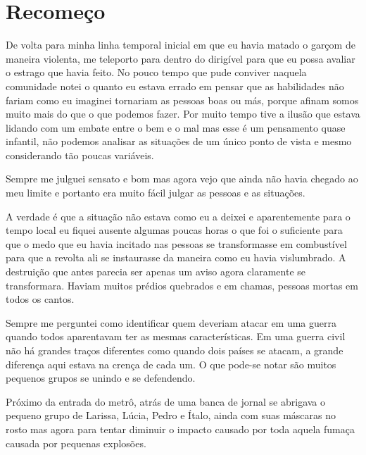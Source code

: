 
\chapter{Recomeço}


De volta para minha linha temporal  inicial em que eu havia matado o garçom de maneira violenta, me teleporto para dentro do dirigível para que eu possa avaliar o estrago que havia feito. No pouco tempo que pude conviver naquela comunidade notei o quanto eu estava errado em pensar que as habilidades não fariam como eu imaginei tornariam as pessoas boas ou más, porque afinam somos muito mais do que o que podemos fazer. Por muito tempo tive a ilusão que estava lidando com um embate entre o bem e o mal mas esse é um pensamento quase infantil, não podemos analisar as situações de um único ponto de vista e mesmo considerando tão poucas variáveis.

Sempre me julguei sensato e bom mas agora vejo que ainda não havia chegado ao meu limite e portanto era muito fácil julgar as pessoas e as situações. 

A verdade é que a situação não estava como eu a deixei e aparentemente para o tempo local eu fiquei ausente algumas poucas horas o que foi o suficiente para que o medo que eu havia incitado nas pessoas se transformasse em combustível para que a revolta ali se instaurasse da maneira como eu havia vislumbrado. A destruição que antes parecia ser apenas um aviso agora claramente se transformara.  Haviam muitos prédios quebrados e em chamas, pessoas mortas em todos os cantos.

Sempre me perguntei como identificar quem deveriam atacar em uma guerra quando todos aparentavam ter as mesmas características. Em uma guerra civil não há grandes traços diferentes como quando dois países se atacam, a grande diferença aqui estava na crença de cada um. O que pode-se notar são muitos pequenos grupos se unindo e se defendendo.

Próximo da entrada do metrô, atrás de uma banca de jornal se abrigava o pequeno grupo de Larissa, Lúcia, Pedro e Ítalo, ainda com suas máscaras no rosto mas agora para tentar diminuir o impacto causado por toda aquela fumaça causada por pequenas explosões.

